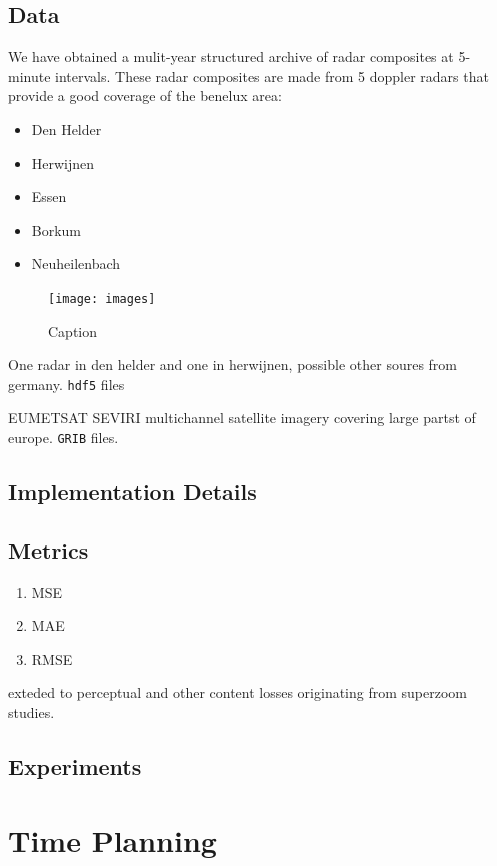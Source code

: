 \documentclass[acmtog, authorversion]{acmart}
\begin{document}
\subsection{Data}

We have obtained a mulit-year structured archive of radar composites at 5-minute intervals. These radar composites are made from 5 doppler radars that provide a good coverage of the benelux area:
\begin{itemize}
    \item Den Helder
    \item Herwijnen
    \item Essen
    \item Borkum
    \item Neuheilenbach
\end{itemize}

\begin{figure}
    \centering
    \texttt{[image: images]}
    \caption{Caption}
    \label{fig:my_label}
\end{figure}

One radar in den helder and one in herwijnen, possible other soures from germany. \texttt{hdf5} files

\textsc{EUMETSAT} \textsc{SEVIRI} multichannel satellite imagery covering large partst of europe. \texttt{GRIB} files.

\subsection{Implementation Details}

\subsection{Metrics}

\begin{enumerate}
    \item MSE
    \item MAE
    \item RMSE
\end{enumerate}

exteded to perceptual and other content losses originating from superzoom studies.

\subsection{Experiments}


\section{Time Planning}
\end{document}
